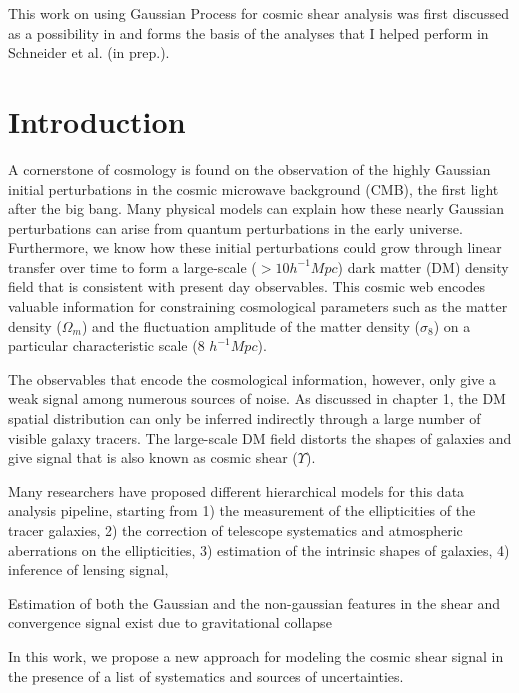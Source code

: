  
This work on using Gaussian Process for cosmic shear analysis 
was first discussed as a possibility in  \citep{Schneider2014}  and 
forms the basis of the analyses that I helped perform 
in Schneider et al. (in prep.). 

\section{Introduction} 

A cornerstone of cosmology is found on the 
observation of the highly Gaussian initial perturbations in the cosmic microwave 
background (CMB), the first light after the big bang. 
Many physical models can explain how these
nearly Gaussian perturbations can arise from quantum perturbations in the 
early universe. Furthermore, we know how these initial perturbations could grow
through linear transfer over time to form a large-scale ($> 10 h^{-1} Mpc$) 
dark matter (DM) density field that is consistent with present
day observables. This cosmic web encodes valuable information for constraining cosmological
parameters such as the matter density ($\Omega_m$) and the fluctuation amplitude 
of the matter density ($\sigma_8$) on a particular characteristic scale (8
$h^{-1} Mpc$).  

The observables that encode the cosmological information, however,
only give a weak signal among numerous sources of noise. 
As discussed in chapter 1, the DM spatial distribution 
can only be inferred indirectly through a large number of visible galaxy tracers. 
The large-scale DM field distorts the shapes of galaxies and give signal 
that is also known as cosmic shear ($\Upsilon$). 

Many researchers have proposed different
hierarchical models for this data analysis pipeline, starting from 
1) the measurement of the ellipticities of the tracer galaxies, 
2) the correction of telescope systematics and atmospheric aberrations on the
ellipticities,
3) estimation of the intrinsic shapes of galaxies, 
4) inference of lensing signal,  

Estimation of both the Gaussian and the non-gaussian features in the shear and
convergence signal  
exist due to gravitational collapse  


In this work, we propose a new approach for modeling the 
cosmic shear signal in the presence of a list of systematics and sources 
of uncertainties. 
 


